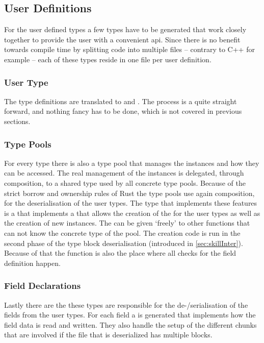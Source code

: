 \documentclass[thesis]{subfiles}
\begin{document}
  \subsection{User Definitions}
    For the user defined types a few types have to be generated that work closely together to provide the user with a convenient \gls{api}.
    Since there is no benefit towards compile time by splitting code into multiple files -- contrary to C++ for example -- each of these types reside in one file per user definition.

    \subsubsection{User Type}
      The type definitions are translated to \structs and \traits.
      The process is a quite straight forward, and nothing fancy has to be done, which is not covered in previous sections.

    \subsubsection{Type Pools}
      For every type there is also a type pool that manages the instances and how they can be accessed.
      The real management of the instances is delegated, through composition, to a shared type used by all concrete type pools.
      Because of the strict borrow and ownership rules of Rust the type pools use again composition, for the deserialisation of the user types.
      The type that implements these features is a  that implements a \trait that allows the creation of the \FieldDefinitions for the user types as well as the creation of new instances.
      The \trait can be given `freely' to other functions that can not know the concrete type of the pool.
      The \FieldDefinition creation code is run in the second phase of the type block deserialisation (introduced in \autoref{sec:skillInter}).
      Because of that the  function is also the place where all checks for the field definition happen.

    \subsubsection{Field Declarations}
      Lastly there are the \FieldDefinitions these types are responsible for the de-/serialisation of the fields from the user types.
      For each field a \FieldDefinition is generated that implements how the field data is read and written.
      They also handle the setup of the different chunks that are involved if the file that is deserialized has multiple blocks.
\end{document}
